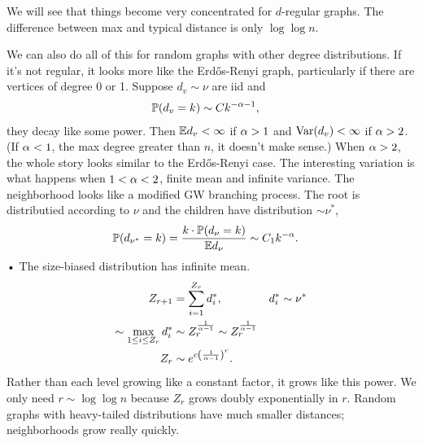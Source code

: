 
We will see that things become very concentrated for $d$-regular graphs. The difference between max and typical distance is only $\log\log n$.

We can also do all of this for random graphs with other degree distributions. If it's not regular, it looks more like the Erd\H os-Renyi graph, particularly if there are vertices of degree 0 or 1. Suppose $d_v\sim \nu$ are iid and 
\begin{align}
\mathbb{P}(d_v = k) &\sim C k^{-\alpha-1},
\end{align}
they decay like some power. Then $\mathbb{E} d_v<\infty$ if $\alpha>1$ and $\operatorname{Var}(d_v)<\infty$ if $\alpha>2$. (If $\alpha<1$, the max degree greater than $n$, it doesn't make sense.)
When $\alpha>2$, the whole story looks similar to the Erd\H os-Renyi case. The interesting variation is what happens when $1<\alpha<2$, finite mean and infinite variance.
The neighborhood looks like a modified GW branching process. The root is distributied according to $\nu$ and the children have distribution $\sim \nu^*$, 
\begin{align}
\mathbb{P}(d_{\nu^*} = k) &=\frac{k\cdot \mathbb{P}(d_\nu = k)}{\mathbb{E} d_\nu} \sim C_1 k^{-\alpha}.
\end{align}•
The size-biased distribution has infinite mean.
\begin{align}
Z_{r+1} &= \sum_{i=1}^{Z_r} d_i^*,& d_i^*&\sim \nu^*\\
\sim \max_{1\le i\le Z_r} d_i^* &\sim Z_r^{\frac{1}{\alpha-1}}\sim Z_r^{\frac{1}{\alpha-1}}\\
Z_r &\sim e^{c\left( {\frac{1}{\alpha-1}} \right)^r}.
\end{align}
Rather than each level growing like a constant factor, it grows like this power. %
We only need $r\sim \log \log n$ because $Z_r$ grows doubly exponentially in $r$. Random graphs with heavy-tailed distributions have much smaller distances; neighborhoods grow really quickly. %